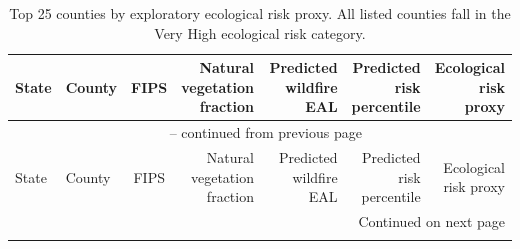 \begin{longtable}{p{1.8cm} p{1.9cm} c r r r r}
\caption{Top 25 counties by exploratory ecological risk proxy. All listed counties fall in the Very High ecological risk category.}
\label{tab:top25_ecological_risk_proxy_counties}\\

\toprule
State & County & FIPS &
\shortstack{Natural\\vegetation\\fraction} &
\shortstack{Predicted\\wildfire EAL} &
\shortstack{Predicted\\risk\\percentile} &
\shortstack{Ecological\\risk proxy} \\
\midrule
\endfirsthead

\multicolumn{7}{c}{\tablename~\thetable{} -- continued from previous page} \\
\toprule
State & County & FIPS &
\shortstack{Natural\\vegetation\\fraction} &
\shortstack{Predicted\\wildfire EAL} &
\shortstack{Predicted\\risk\\percentile} &
\shortstack{Ecological\\risk proxy} \\
\midrule
\endhead

\midrule
\multicolumn{7}{r}{Continued on next page} \\
\endfoot

\bottomrule
\endlastfoot


\end{longtable}
